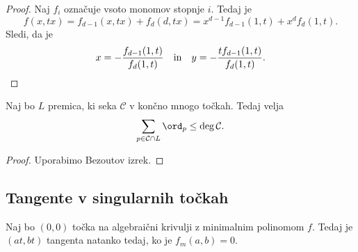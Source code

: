 \begin{proof}
Naj $f_i$ označuje vsoto monomov stopnje $i$. Tedaj je
\[
f(x, tx) =
f_{d-1}(x, tx) + f_d(d,tx) =
x^{d-1} f_{d-1}(1, t) + x^d f_d(1, t).
\]
Sledi, da je
\[
x = -\frac{f_{d-1}(1, t)}{f_d(1, t)}
\quad \text{in} \quad
y = -\frac{t f_{d-1}(1, t)}{f_d(1, t)}. \qedhere
\]
\end{proof}

\begin{posledica}
Naj bo $L$ premica, ki seka $\mathcal{C}$ v končno mnogo točkah.
Tedaj velja
\[
\sum_{p \in \mathcal{C} \cap L} \ord_p \leq \deg \mathcal{C}.
\]
\end{posledica}

\begin{proof}
Uporabimo Bezoutov izrek.
\end{proof}

\newpage

\subsection{Tangente v singularnih točkah}

\begin{trditev}
Naj bo $(0, 0)$ točka na algebraični krivulji z minimalnim
polinomom $f$. Tedaj je $(at, bt)$ tangenta natanko tedaj, ko je
$f_m(a,b) = 0$.
\end{trditev}

\obvs


